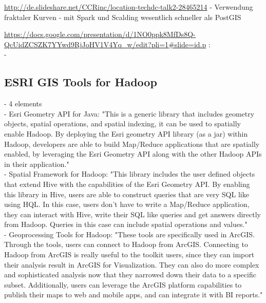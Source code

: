 \url{http://de.slideshare.net/CCRinc/location-techdc-talk2-28465214}
- Verwendung fraktaler Kurven
- mit Spark und Scalding wesentlich schneller als PostGIS


\url{https://docs.google.com/presentation/d/1NO0ppk8MfDs8Q-QcUidZCSZK7YYwd9RjJoHV1V4Yq_w/edit?pli=1#slide=id.p} :\\
- 





\subsection{ESRI GIS Tools for Hadoop}
- 4 elements\\
- Esri Geometry API for Java: "This is a generic library that includes geometry objects, spatial operations, and spatial indexing, it can be used to spatially enable Hadoop. By deploying the Esri geometry API library (as a jar) within Hadoop, developers are able to build Map/Reduce applications that are spatially enabled, by leveraging the Esri Geometry API along with the other Hadoop APIs in their application."\cite{website:esri-hadoop2}\\
- Spatial Framework for Hadoop: "This library includes the user defined objects that extend Hive with the capabilities of the Esri Geometry API. By enabling this library in Hive, users are able to construct queries that are very SQL like using HQL. In this case, users don’t have to write a Map/Reduce application, they can interact with Hive, write their SQL like queries and get answers directly from Hadoop. Queries in this case can include spatial operations and values."\cite{website:esri-hadoop2}\\
- Geoprocessing Tools for Hadoop: "These tools are specifically used in ArcGIS. Through the tools, users can connect to Hadoop from ArcGIS. Connecting to Hadoop from ArcGIS is really useful to the toolkit users, since they can import their analysis result in ArcGIS for Visualization. They can also do more complex and sophisticated analysis now that they narrowed down their data to a specific subset. Additionally, users can leverage the ArcGIS platform capabilities to publish their maps to web and mobile apps, and can integrate it with BI reports."\cite{website:esri-hadoop2}\\
